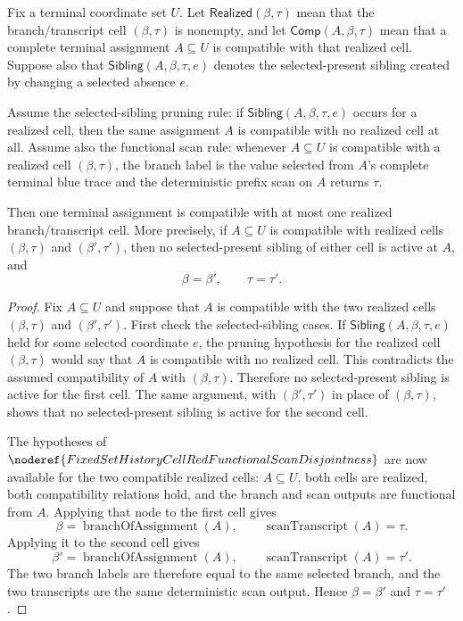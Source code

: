 \begin{helper}
Fix a terminal coordinate set \(U\).  Let
\(\mathsf{Realized}(\beta,\tau)\) mean that the branch/transcript cell
\((\beta,\tau)\) is nonempty, and let
\(\mathsf{Comp}(A,\beta,\tau)\) mean that a complete terminal assignment
\(A\subseteq U\) is compatible with that realized cell.  Suppose also that
\(\mathsf{Sibling}(A,\beta,\tau,e)\) denotes the selected-present sibling
created by changing a selected absence \(e\).

Assume the selected-sibling pruning rule: if
\(\mathsf{Sibling}(A,\beta,\tau,e)\) occurs for a realized cell, then the
same assignment \(A\) is compatible with no realized cell at all.  Assume
also the functional scan rule: whenever \(A\subseteq U\) is compatible with
a realized cell \((\beta,\tau)\), the branch label is the value selected
from \(A\)'s complete terminal blue trace and the deterministic prefix scan
on \(A\) returns \(\tau\).

Then one terminal assignment is compatible with at most one realized
branch/transcript cell.  More precisely, if \(A\subseteq U\) is compatible
with realized cells \((\beta,\tau)\) and \((\beta',\tau')\), then no
selected-present sibling of either cell is active at \(A\), and
\[
\beta=\beta',
\qquad
\tau=\tau'.
\]
\end{helper}
\begin{proof}
Fix \(A\subseteq U\) and suppose that \(A\) is compatible with the two
realized cells \((\beta,\tau)\) and \((\beta',\tau')\).  First check the
selected-sibling cases.  If
\(\mathsf{Sibling}(A,\beta,\tau,e)\) held for some selected coordinate
\(e\), the pruning hypothesis for the realized cell \((\beta,\tau)\) would
say that \(A\) is compatible with no realized cell.  This contradicts the
assumed compatibility of \(A\) with \((\beta,\tau)\).  Therefore no
selected-present sibling is active for the first cell.  The same argument,
with \((\beta',\tau')\) in place of \((\beta,\tau)\), shows that no
selected-present sibling is active for the second cell.

The hypotheses of
\(\noderef{FixedSetHistoryCellRedFunctionalScanDisjointness}\) are now
available for the two compatible realized cells: \(A\subseteq U\), both
cells are realized, both compatibility relations hold, and the branch and
scan outputs are functional from \(A\).  Applying that node to the first
cell gives
\[
\beta=\operatorname{branchOfAssignment}(A),
\qquad
\operatorname{scanTranscript}(A)=\tau.
\]
Applying it to the second cell gives
\[
\beta'=\operatorname{branchOfAssignment}(A),
\qquad
\operatorname{scanTranscript}(A)=\tau'.
\]
The two branch labels are therefore equal to the same selected branch, and
the two transcripts are the same deterministic scan output.  Hence
\(\beta=\beta'\) and \(\tau=\tau'\).
\end{proof}
